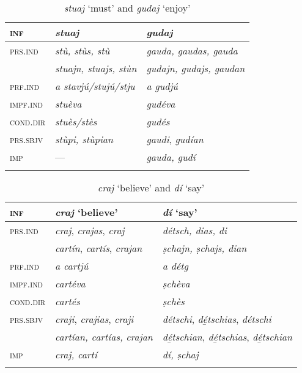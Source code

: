 \begin{table}
	\caption{\textit{stuaj} `must' and \textit{gudaj} `enjoy'}

	\begin{tabular}{lll}
		\lsptoprule
		\textsc{inf} & \textit{\textbf{stuaj}} & \textbf{\textit{gudaj}}\\
		\midrule
		\textsc{prs.ind} & \textit{stù, stùs, stù} & \textit{gauda, gaudas, gauda}\\
		& \textit{stuajn, stuajs, stùn} & \textit{gudajn, gudajs, gaudan}\\
		\textsc{prf.ind} & \textit{a stavjú/stujú/stju} & \textit{a gudjú}\\
		\textsc{impf.ind} & \textit{stuèva} & \textit{gudéva}\\
		\textsc{cond.dir} & \textit{stuès/stès} & \textit{gudés}\\
		\textsc{prs.sbjv} & \textit{stùpi, stùpian} & \textit{gaudi}, \textit{gudían}\\
		\textsc{imp} & --- & \textit{gauda, gudí}\\
		\lspbottomrule
	\end{tabular}
\end{table}


\begin{table}
	\caption{\textit{craj} `believe' and \textit{dí} `say'}

	\begin{tabular}{lll}
		\lsptoprule
		\textsc{inf} & \textit{\textbf{craj}} `believe' & \textit{\textbf{dí}} `say'\\
		\midrule
		\textsc{prs.ind} & \textit{craj}, \textit{crajas}, \textit{craj} & \textit{détsch, dias, di}\\
		& \textit{cartín}, \textit{cartís}, \textit{crajan} & \textit{ṣchajn, ṣchajs, dian}\\
		\textsc{prf.ind} & \textit{a cartjú} & \textit{a détg}\\
		\textsc{impf.ind} & \textit{cartéva} & \textit{ṣchèva} \\
		\textsc{cond.dir} & \textit{cartés} & \textit{ṣchès}\\
		\textsc{prs.sbjv} & \textit{craji}, \textit{crajias}, \textit{craji} & \textit{détschi}, \textit{dé̱tschias}, \textit{détschi}\\
		&\textit{cartían, cartías,} \textit{crajan} & \textit{dé̱tschian}, \textit{dé̱tschias}, \textit{dé̱tschian}\\
		\textsc{imp} & \textit{craj, cartí} & \textit{dí, ṣchaj}\\
		\lspbottomrule
	\end{tabular}
\end{table}


